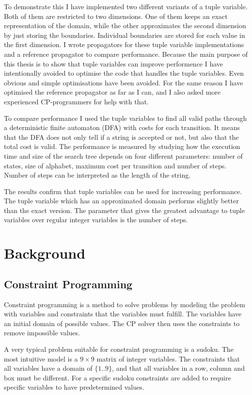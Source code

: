 \documentclass[a4paper,11pt]{article}
\begin{document}
To demonstrate this I have implemented two different variants of a tuple variable. Both of them are restricted to two dimensions. One of them keeps an exact representation of the domain, while the other approximates the second dimension by just storing the boundaries. Individual boundaries are stored for each value in the first dimension. I wrote propagators for these tuple variable implementations and a reference propagator to compare performance. Because the main purpose of this thesis is to show that tuple variables can improve performence I have intentionally avoided to optimise the code that handles the tuple variables. Even obvious and simple optimisations have been avoided. For the same reason I have optimised the reference propagator as far as I can, and I also asked more experienced CP-programmers for help with that.

To compare performance I used the tuple variables to find all valid paths through a deterministic finite automaton (DFA) with costs for each transition. It means that the DFA does not only tell if a string is accepted or not, but also that the total cost is valid. The performance is measured by studying how the execution time and size of the search tree depends on four different parameters: number of states, size of alphabet, maximum cost per transition and number of steps. Number of steps can be interpreted as the length of the string.

The results confirm that tuple variables can be used for increasing performance. The tuple variable which has an approximated domain performs slightly better than the exact version. The parameter that gives the greatest advantage to tuple variables over regular integer variables is the number of steps.



\section{Background}
\subsection{Constraint Programming}

Constraint programming is a method to solve problems by modeling the problem with variables and constraints that the variables must fulfill. The variables have an initial domain of possible values. The CP solver then uses the constraints to remove impossible values. 

A very typical problem suitable for constraint programming is a sudoku. The most intuitive model is a $9\times9$ matrix of integer variables. The constraints that all variables have a domain of $\{1..9\}$, and that all variables in a row, column and box must be different. For a specific sudoku constraints are added to require specific variables to have predetermined values.
\end{document}
